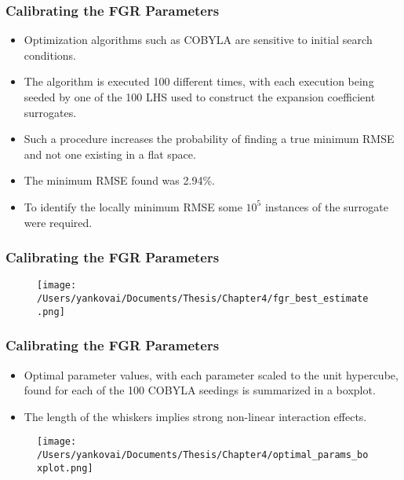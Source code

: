\begin{frame}
\frametitle{Calibrating the FGR Parameters}

\begin{itemize}
  \item Optimization algorithms such as COBYLA are sensitive to initial search conditions.
  \item The algorithm is executed 100 different times, with each execution being seeded by one of the 100 LHS used to construct the expansion coefficient surrogates. 
  \item Such a procedure increases the probability of finding a true minimum RMSE and not one existing in a flat space. 
  \item The minimum RMSE found was 2.94\%.
  \item To identify the locally minimum RMSE some $10^5$ instances of the surrogate were required. 
\end{itemize}

\end{frame}
\begin{frame}
\frametitle{Calibrating the FGR Parameters}

\begin{figure}
  \texttt{[image: /Users/yankovai/Documents/Thesis/Chapter4/fgr\_best\_estimate.png]}
\end{figure}

\end{frame}
\begin{frame}
\frametitle{Calibrating the FGR Parameters}

\begin{itemize}
  \item Optimal parameter values, with each parameter scaled to the unit hypercube, found for each of the 100 COBYLA seedings is summarized in a boxplot.
  \item The length of the whiskers implies strong non-linear interaction effects.
\end{itemize}

\begin{figure}
  \texttt{[image: /Users/yankovai/Documents/Thesis/Chapter4/optimal\_params\_boxplot.png]}
\end{figure}

\end{frame}
